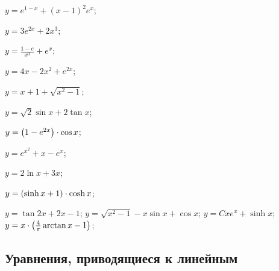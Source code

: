 \begin{enumsols}
		\item \( y = e^{1 - x} + (x - 1)^2 e^{x} \); \sfill %
		\item \( y = 3e^{2x} + 2x^3 \); \sfill %
		\item \( y = \frac{1 - e}{x^3} + e^{x} \); \sfill %
		\item \( y = 4x - 2x^2 + e^{2x} \); \sfill %
		\item \( y = x + 1 + \sqrt{x^2 - 1} \); \sfill %
		\item \( y = \sqrt{2} \sin{x} + 2 \tan{x} \); \sfill %
		\item \( y = \left( 1 - e^{2x} \right) \cdot \cos{x} \); \sfill %
		\item \( y = e^{x^2} + x - e^{x} \); \sfill %
		\item \( y = 2 \ln{x} + 3x \); \sfill %
		\item \( y = \left( \sinh{x} + 1 \right) \cdot \cosh{x} \); \sfill %

		\itemstar \( y = \tan{2x} + 2x - 1 \); \sfill %
		\itemstar \( y = \sqrt{x^2 - 1} - x \sin{x} + \cos{x} \); \sfill %
		\itemstar \( y = C x e^{x} + \sinh{x} \); \sfill %
		\itemstar \( y = x \cdot \left( \frac{4}{\pi} \arctan{x} - 1 \right) \); \sfill %

	\end{enumsols}

\subsection*{Уравнения, приводящиеся к линейным}

